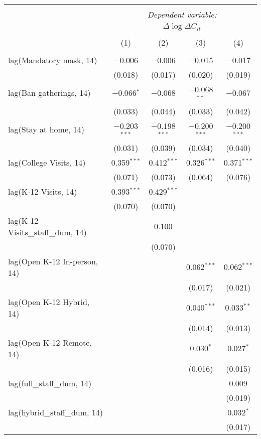 \begin{tabular}{@{\extracolsep{1pt}}lcccc} 
\\[-1.8ex]\hline 
\hline \\[-1.8ex] 
 & \multicolumn{4}{c}{\textit{Dependent variable:}} \\ 
\cline{2-5} 
 & \multicolumn{4}{c}{$\Delta \log \Delta C_{it}$} \\ 
\\[-1.8ex] & (1) & (2) & (3) & (4)\\ 
\hline \\[-1.8ex] 
 lag(Mandatory mask, 14) & $-$0.006 & $-$0.006 & $-$0.015 & $-$0.017 \\ 
  & (0.018) & (0.017) & (0.020) & (0.019) \\ 
  lag(Ban gatherings, 14) & $-$0.066$^{*}$ & $-$0.068 & $-$0.068$^{**}$ & $-$0.067 \\ 
  & (0.033) & (0.044) & (0.033) & (0.042) \\ 
  lag(Stay at home, 14) & $-$0.203$^{***}$ & $-$0.198$^{***}$ & $-$0.200$^{***}$ & $-$0.200$^{***}$ \\ 
  & (0.031) & (0.039) & (0.034) & (0.040) \\ 
  lag(College Visits, 14) & 0.359$^{***}$ & 0.412$^{***}$ & 0.326$^{***}$ & 0.371$^{***}$ \\ 
  & (0.071) & (0.073) & (0.064) & (0.076) \\ 
  lag(K-12 Visits, 14) & 0.393$^{***}$ & 0.429$^{***}$ &  &  \\ 
  & (0.070) & (0.070) &  &  \\ 
  lag(K-12 Visits\_staff\_dum, 14) &  & 0.100 &  &  \\ 
  &  & (0.070) &  &  \\ 
  lag(Open K-12 In-person, 14) &  &  & 0.062$^{***}$ & 0.062$^{***}$ \\ 
  &  &  & (0.017) & (0.021) \\ 
  lag(Open K-12 Hybrid, 14) &  &  & 0.040$^{***}$ & 0.033$^{**}$ \\ 
  &  &  & (0.014) & (0.013) \\ 
  lag(Open K-12 Remote, 14) &  &  & 0.030$^{*}$ & 0.027$^{*}$ \\ 
  &  &  & (0.016) & (0.015) \\ 
  lag(full\_staff\_dum, 14) &  &  &  & 0.009 \\ 
  &  &  &  & (0.019) \\ 
  lag(hybrid\_staff\_dum, 14) &  &  &  & 0.032$^{*}$ \\ 
  &  &  &  & (0.017) \\ 

\end{tabular}
